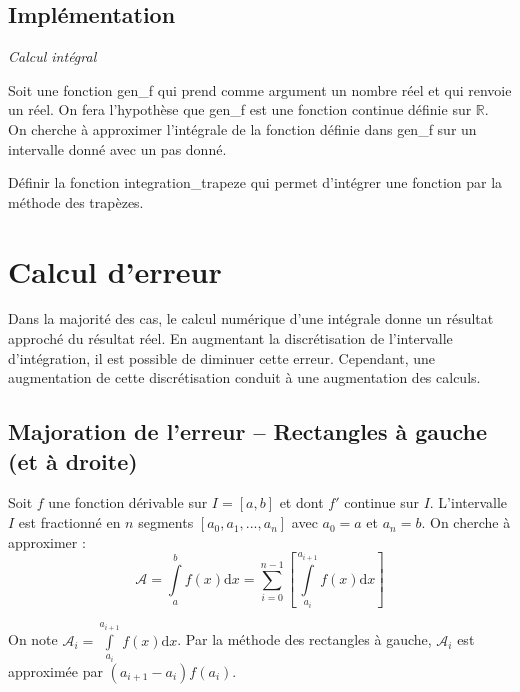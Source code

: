 \documentclass[10pt]{article}
\begin{document}
\begin{minipage}[c]{.38\linewidth}
\end{minipage}

\subsection{Implémentation}
\begin{exemple}
\textit{Calcul intégral}

Soit une fonction \textsf{gen\_f} qui prend comme argument un nombre réel et qui renvoie un réel. On fera l'hypothèse que \textsf{gen\_f} est une fonction continue définie sur $\mathbb{R}$. On cherche à approximer l'intégrale de la fonction définie dans \textsf{gen\_f} sur un intervalle donné avec un pas donné. 

Définir la fonction \textsf{integration\_trapeze} qui permet d'intégrer une fonction par la méthode des trapèzes.

\end{exemple}

\section{Calcul d'erreur}
Dans la majorité des cas, le calcul numérique d'une intégrale donne un résultat approché du résultat réel. En augmentant la discrétisation de l'intervalle d'intégration, il est possible de diminuer cette erreur. Cependant, une augmentation de cette discrétisation conduit à une augmentation des calculs. 


\subsection{Majoration de l'erreur -- Rectangles à gauche (et à droite)}
Soit $f$ une fonction dérivable sur $I=[a,b]$ et dont $f'$ continue sur $I$. L'intervalle $I$ est fractionné en $n$ segments $[a_0, a_1, ..., a_n]$ avec $a_0 = a$ et $a_n=b$. On cherche à approximer :
$$
\mathcal{A}=\int\limits_a^{b}f(x)\mathrm{d}x =  \sum\limits_{i=0}^{n-1} \left[\int\limits_{a_i}^{a_{i+1}}f(x)\mathrm{d}x \right]
$$

On note $\mathcal{A}_i = \int\limits_{a_i}^{a_{i+1}}f(x)\mathrm{d}x $. Par la méthode des rectangles à gauche, $\mathcal{A}_i$ est approximée par $\left(a_{i+1}-a_{i}\right) f(a_i) $. 
\end{document}
